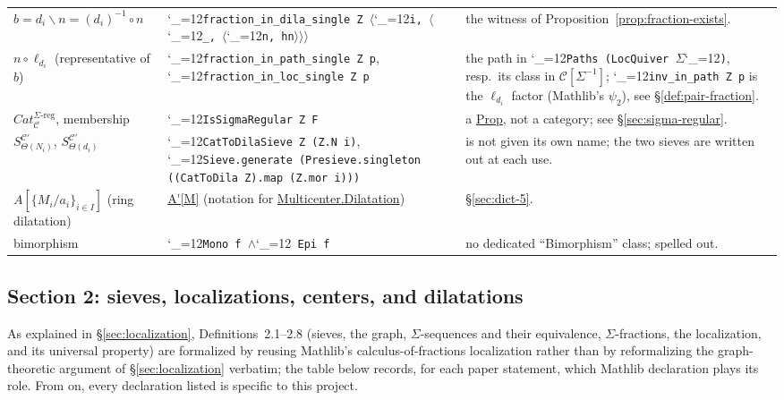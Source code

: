\documentclass[11pt]{amsart}
\newcommand{\lc}[1]{\url{#1}}
\newcommand{\lcode}{\begingroup\catcode`\_=12\relax\lcodeInner}
\newcommand{\lcodeInner}[1]{\texttt{#1}\endgroup}
\theoremstyle{plain}
\theoremstyle{definition}
\theoremstyle{remark}
\newcommand{\calC}{\mathcal C}
\begin{document}
\begin{longtable}{@{}p{2.3cm}p{3.9cm}p{5.1cm}@{}}
$b = d_i \backslash n = (d_i)^{-1}\circ n$ & \lcode{fraction\allowbreak_in_dila\allowbreak_single Z }\ensuremath{\langle}\lcode{i, }\ensuremath{\langle}\lcode{_, }\ensuremath{\langle}\lcode{n, hn}\ensuremath{\rangle}\ensuremath{\rangle}\ensuremath{\rangle} & the witness of Proposition~\ref{prop:fraction-exists}. \\
$n \circ \ell_{d_i}$ (representative of $b$) & \lcode{fraction\allowbreak_in_path\allowbreak_single Z p}, \lcode{fraction\allowbreak_in_loc\allowbreak_single Z p} & the path in \lcode{Paths (LocQuiver }\ensuremath{\Sigma}\lcode{)}, resp.\ its class in $\calC[\Sigma^{-1}]$; \lcode{inv\allowbreak_in\allowbreak_path Z p} is the $\ell_{d_i}$ factor (Mathlib's \ensuremath{\psi_2}), see \S\ref{def:pair-fraction}. \\
$Cat_\calC^{\Sigma\text{-reg}}$, membership & \lcode{IsSigmaRegular Z F} & a \lc{Prop}, not a category; see \S\ref{sec:sigma-regular}. \\
$S^{\calC'}_{\Theta(N_i)}$, $S^{\calC'}_{\Theta(d_i)}$ & \lcode{CatToDilaSieve Z (Z.N i)}, \lcode{Sieve.generate (Presieve.singleton ((CatToDila Z).map (Z.mor i)))} & \citep[Definition~3.4]{Mayeux} is not given its own name; the two sieves are written out at each use. \\
$A[\{M_i/a_i\}_{i\in I}]$ (ring dilatation) & \lc{A'[M]} (notation for \lc{Multicenter.Dilatation}) & \S\ref{sec:dict-5}. \\
bimorphism & \lcode{Mono f }\ensuremath{\wedge}\lcode{ Epi f} & no dedicated ``Bimorphism'' class; spelled out. \\
\end{longtable}
\endgroup

\subsection{Section 2: sieves, localizations, centers, and dilatations}
\label{sec:dict-2}

As explained in \S\ref{sec:localization}, Definitions~2.1--2.8 (sieves, the graph, $\Sigma$-sequences
and their equivalence, $\Sigma$-fractions, the localization, and its universal property) are
formalized by reusing Mathlib's calculus-of-fractions localization rather than by
reformalizing the graph-theoretic argument of \S\ref{sec:localization} verbatim; the table below
records, for each paper statement, which Mathlib declaration plays its role. From
\citep[Definition~2.9]{Mayeux} on, every declaration listed is specific to this project.
\end{document}
